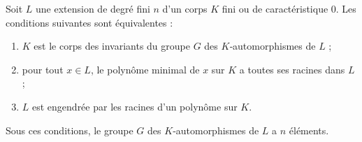 \documentclass[11pt, %
  title in boldface,
  theorem in new line,
  theorem numbering = section,
  number theorems separately,
  simple name,
]{beaulivre}
\begin{document}
    \begin{theorem}\label{thm:extension galoisienne}
        Soit \( L \) une extension de degré fini \( n \) d'un corps \( K \) fini ou de caractéristique \( 0 \). Les conditions suivantes sont équivalentes :
        \begin{enumerate}
            \item \label{thm:extension galoisienne;cond1} \( K \) est le corps des invariants du groupe \( G \) des \( K \)‑automorphismes de \( L \) ;
            \item \label{thm:extension galoisienne;cond2} pour tout \( x \in L \), le polynôme minimal de \( x \) sur \( K \) a toutes ses racines dans \( L \) ;
            \item \label{thm:extension galoisienne;cond3} \( L \) est engendrée par les racines d'un polynôme sur \( K \).
        \end{enumerate}
        Sous ces conditions, le groupe \( G \) des \( K \)‑automorphismes de \( L \) a \( n \) éléments.
    \end{theorem}
\end{document}
